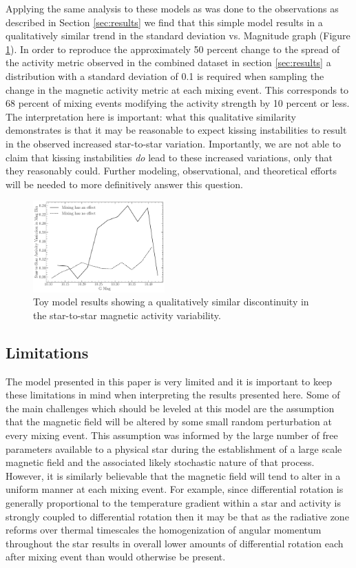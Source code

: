 Applying the same analysis to these models as was done to the observations as
described in Section \ref{sec:results} we find that this simple model results
in a qualitatively similar trend in the standard deviation vs. Magnitude graph
(Figure \ref{fig:model}). In order to reproduce the approximately 50 percent
change to the spread of the activity metric observed in the combined dataset in
section \ref{sec:results} a distribution with a standard deviation of 0.1 is
required when sampling the change in the magnetic activity metric at each
mixing event. This corresponds to 68 percent of mixing events modifying the
activity strength by 10 percent or less. The interpretation here is important:
what this qualitative similarity demonstrates is that it may be reasonable to
expect kissing instabilities to result in the observed increased star-to-star
variation. Importantly, we are not able to claim that kissing instabilities
\textit{do} lead to these increased variations, only that they reasonably
could. Further modeling, observational, and theoretical efforts will be needed
to more definitively answer this question.

\begin{figure}
  \centering
  \includegraphics[width=0.45\textwidth]{figures/SpreadModel.pdf}
  \caption{Toy model results showing a qualitatively similar discontinuity in the star-to-star magnetic activity variability.}
  \label{fig:model}
\end{figure}

\subsection{Limitations}
The model presented in this paper is very limited and it is important to keep
these limitations in mind when interpreting the results presented here. Some of
the main challenges which should be leveled at this model are the assumption
that the magnetic field will be altered by some small random perturbation at
every mixing event. This assumption was informed by the large number of free
parameters available to a physical star during the establishment of a large
scale magnetic field and the associated likely stochastic nature of that
process. However, it is similarly believable that the magnetic field will tend
to alter in a uniform manner at each mixing event. For example, since
differential rotation is generally proportional to the temperature gradient
within a star and activity is strongly coupled to differential rotation then it
may be that as the radiative zone reforms over thermal timescales the
homogenization of angular momentum throughout the star results in overall lower
amounts of differential rotation each after mixing event than would otherwise
be present.

